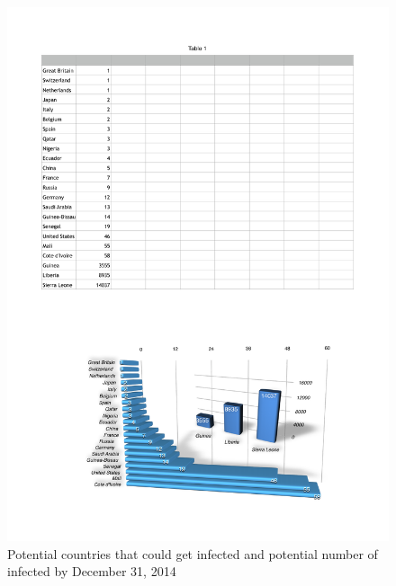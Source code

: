 \documentclass[10pt, journal,onecolumn]{IEEEtran}
\begin{document}
\begin{figure}[ht]
\centering
\includegraphics[scale=.6]{countriesinfected.pdf}
\caption{Potential countries that could get infected and potential number of infected by December 31, 2014}
\label{Fig:world_infected}
\end{figure}
\end{document}
